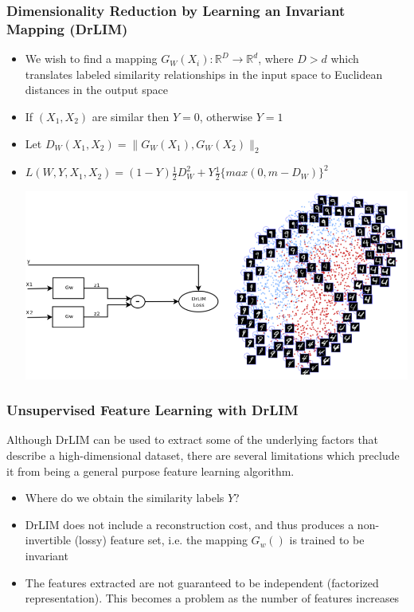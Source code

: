 \documentclass{beamer}
\begin{document}
\begin{frame}
\frametitle{Dimensionality Reduction by Learning an Invariant Mapping (DrLIM)} 
\begin{itemize}
\item{We wish to find a mapping $G_W(X_i): \mathbb{R}^D \rightarrow \mathbb{R}^d$, where $D>d$ which translates labeled similarity relationships in the input space to Euclidean distances in the output space} 
\item{If $(X_1, X_2)$ are similar then $Y=0$, otherwise $Y=1$}
\item{Let $D_W(X_1, X_2) = \|G_W(X_1),G_W(X_2)\|_2$}
\item{$L(W,Y,X_1,X_2) = (1-Y)\frac{1}{2}D_W^2 + Y \frac{1}{2}\{max(0,m-D_W)\}^2$}   
\begin{center}
\includegraphics[scale = 0.3]{./figures/drlim_mnist.png}  
\end{center} 
\end{itemize} 
\end{frame} 

\begin{frame}
\frametitle{Unsupervised Feature Learning with DrLIM}
Although DrLIM can be used to extract some of the underlying factors that describe a high-dimensional dataset, there are several limitations which preclude it from being a general purpose feature learning algorithm.  
\begin{itemize}
\item Where do we obtain the similarity labels $Y$?
\item DrLIM does not include a reconstruction cost, and thus produces a non-invertible (lossy) feature set, i.e. the mapping $G_w()$ is trained to be invariant 
\item The features extracted are not guaranteed to be independent (factorized representation). This becomes a problem as the number of features increases
\end{itemize}
\end{frame}
\end{document}

